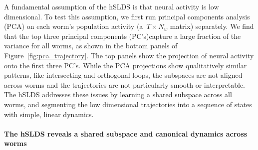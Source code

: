 \documentclass{article}
\begin{document}
A fundamental assumption of the hSLDS is that neural activity is
low dimensional. To test this assumption, we first run principal
components analysis (PCA) on each worm's
population activity (a~$T \times N_w$ matrix) separately. We find
that the top three principal components (PC's)capture a large fraction
of the variance for all worms, as shown in the bottom panels of
Figure~\ref{fig:pca_trajectory}. The top panels show the projection
of neural activity onto the first three PC's. While the PCA
projections show qualitatively similar patterns, like intersecting
and orthogonal loops, the subspaces are not aligned across worms
and the trajectories are not particularly smooth or interpretable.
The hSLDS addresses these issues by learning a shared subspace
across all worms, and segmenting the low dimensional
trajectories into a sequence of states with simple, linear dynamics.


\paragraph{The hSLDS reveals a shared subspace and canonical dynamics across worms}
\end{document}
